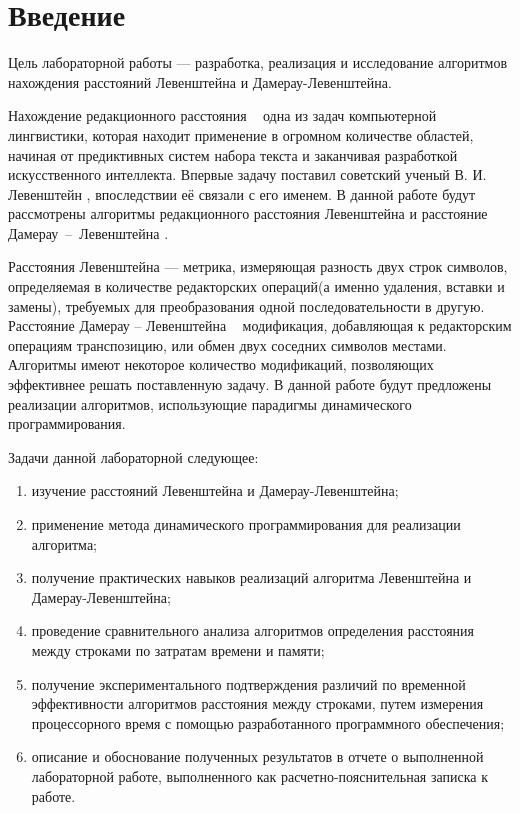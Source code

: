 \chapter*{Введение}

Цель лабораторной работы --- разработка, реализация и исследование алгоритмов нахождения расстояний Левенштейна и Дамерау-Левенштейна.

Нахождение редакционного расстояния ~ одна из задач компьютерной лингвистики, которая находит применение в огромном количестве областей, начиная от предиктивных систем набора текста и заканчивая разработкой искусственного интеллекта. Впервые задачу поставил советский ученый В. И. Левенштейн \cite{Lev1965}, впоследствии её связали с его именем. В данной работе будут рассмотрены алгоритмы редакционного расстояния Левенштейна и расстояние Дамерау \,--\, Левенштейна \cite{damerau}.

Расстояния Левенштейна --- метрика, измеряющая разность двух строк символов, определяемая в количестве редакторских операций(а именно удаления, вставки и замены), требуемых для преобразования одной последовательности в другую.  Расстояние Дамерау -- Левенштейна ~ модификация, добавляющая к редакторским операциям транспозицию, или обмен двух соседних символов местами.
Алгоритмы имеют некоторое количество модификаций, позволяющих эффективнее решать поставленную задачу. В данной работе будут предложены реализации алгоритмов, использующие парадигмы динамического программирования. 


\newpage

Задачи данной лабораторной следующее:

\begin{enumerate}[label=\arabic*)]
	\item изучение расстояний Левенштейна и Дамерау-Левенштейна;
	
	\item применение метода динамического программирования для реализации алгоритма;
	
	\item получение практических навыков реализаций алгоритма Левенштейна и Дамерау-Левенштейна;
	
	\item проведение сравнительного анализа алгоритмов определения расстояния между строками по затратам времени и памяти;
	
	\item получение экспериментального подтверждения различий по временной эффективности алгоритмов расстояния между строками, путем измерения процессорного время с помощью разработанного программного обеспечения;
	
	\item описание и обоснование полученных результатов в отчете о выполненной лабораторной работе, выполненного как расчетно-пояснительная записка к работе. 
\end{enumerate}

